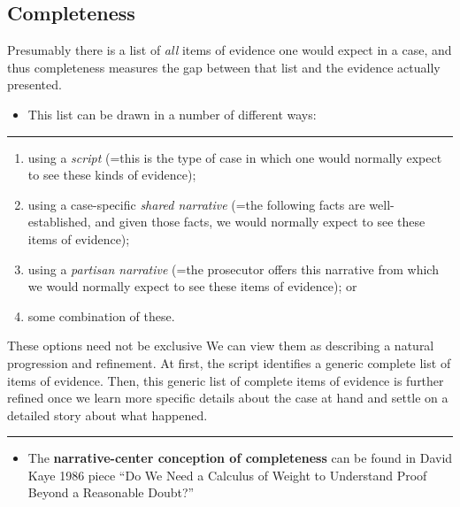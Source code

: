\documentclass[
  10pt,
  dvipsnames,enabledeprecatedfontcommands]{scrartcl}
\providecommand{\tightlist}{%
  \setlength{\itemsep}{0pt}\setlength{\parskip}{0pt}}
\begin{document}
\hypertarget{completeness}{%
\subsection{Completeness}\label{completeness}}

Presumably there is a list of \emph{all} items of evidence one would
expect in a case, and thus completeness measures the gap between that
list and the evidence actually presented.

\begin{itemize}
\tightlist
\item
  This list can be drawn in a number of different ways:
\end{itemize}

\begin{center}\rule{0.5\linewidth}{0.5pt}\end{center}

\begin{enumerate}
\def\labelenumi{(\alph{enumi})}
\item
  using a \emph{script} (=this is the type of case in which one would
  normally expect to see these kinds of evidence);
\item
  using a case-specific \emph{shared narrative} (=the following facts
  are well-established, and given those facts, we would normally expect
  to see these items of evidence);
\item
  using a \emph{partisan narrative} (=the prosecutor offers this
  narrative from which we would normally expect to see these items of
  evidence); or
\item
  some combination of these.
\end{enumerate}

These options need not be exclusive We can view them as describing a
natural progression and refinement. At first, the script identifies a
generic complete list of items of evidence. Then, this generic list of
complete items of evidence is further refined once we learn more
specific details about the case at hand and settle on a detailed story
about what happened.

\begin{center}\rule{0.5\linewidth}{0.5pt}\end{center}

\begin{itemize}
\tightlist
\item
  The \textbf{narrative-center conception of completeness} can be found
  in David Kaye 1986 piece ``Do We Need a Calculus of Weight to
  Understand Proof Beyond a Reasonable Doubt?''
\end{itemize}
\end{document}
